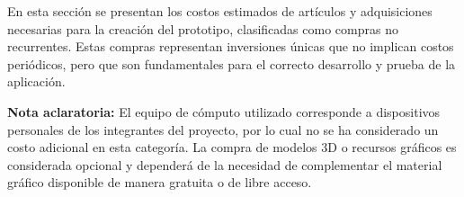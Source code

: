 En esta sección se presentan los costos estimados de artículos y adquisiciones necesarias para la creación del prototipo, clasificadas como compras no recurrentes. Estas compras representan inversiones únicas que no implican costos periódicos, pero que son fundamentales para el correcto desarrollo y prueba de la aplicación.

\begin{table}[H]
	\centering
	\renewcommand{\arraystretch}{1.5}
	\setlength{\tabcolsep}{8pt}
	\caption{Costos estimados de artículos y compras no recurrentes en el escenario académico.}
	\label{tab:compras_no_recurrentes}
\end{table}

\noindent \textbf{Nota aclaratoria:}  
El equipo de cómputo utilizado corresponde a dispositivos personales de los integrantes del proyecto, por lo cual no se ha considerado un costo adicional en esta categoría. La compra de modelos 3D o recursos gráficos es considerada opcional y dependerá de la necesidad de complementar el material gráfico disponible de manera gratuita o de libre acceso.

